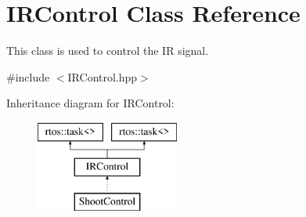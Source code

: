 \hypertarget{class_i_r_control}{}\section{I\+R\+Control Class Reference}
\label{class_i_r_control}


This class is used to control the IR signal.  




{\ttfamily \#include $<$I\+R\+Control.\+hpp$>$}

Inheritance diagram for I\+R\+Control\+:\begin{figure}[H]
\begin{center}
\leavevmode
\includegraphics[height=3.000000cm]{class_i_r_control}
\end{center}
\end{figure}
